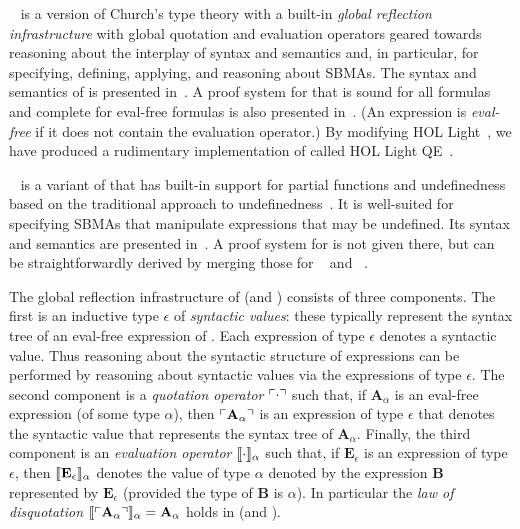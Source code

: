 \documentclass[fleqn]{llncs}
\begin{document}
{\churchqe}~\cite{Farmer18} is a version of Church's type theory with
a built-in \emph{global reflection infrastructure} with global
quotation and evaluation operators geared towards reasoning
about the interplay of syntax and semantics and, in particular, for
specifying, defining, applying, and reasoning about SBMAs.  The syntax
and semantics of {\churchqe} is presented in~\cite{Farmer18}.  A proof
system for {\churchqe} that is sound for all formulas and complete for
eval-free formulas is also presented in~\cite{Farmer18}.  (An
expression is \emph{eval-free} if it does not contain the evaluation
operator.) By modifying HOL Light~\cite{Harrison09}, we have produced
a rudimentary implementation of {\churchqe} called HOL Light
QE~\cite{CaretteFarmerLaskowski18}.

{\churchuqe}~\cite{Farmer17} is a variant of {\churchqe} that has
built-in support for partial functions and undefinedness based on the
traditional approach to undefinedness~\cite{Farmer04}.  It is
well-suited for specifying SBMAs that manipulate expressions that may
be undefined.  Its syntax and semantics are presented in~\cite{Farmer17}.  A
proof system for {\churchuqe} is not given there, but can be straightforwardly
derived by merging those for {\churchqe}~\cite{Farmer18}
and {\qzerou}~\cite{Farmer08a}.

The global reflection infrastructure of {\churchuqe} (and {\churchqe})
consists of three components.  The first is an inductive
type $\epsilon$ of \emph{syntactic values}: these
typically represent the syntax tree of an eval-free expression of
{\churchuqe}.  Each expression of type $\epsilon$ denotes a syntactic
value.  Thus reasoning about the syntactic structure of expressions
can be performed by reasoning about syntactic values via the
expressions of type $\epsilon$.  The second component is a
\emph{quotation operator} $\ulcorner\cdot\urcorner$ such that, if
$\textbf{A}_\alpha$ is an eval-free expression (of some type
$\alpha$), then $\ulcorner\textbf{A}_\alpha\urcorner$ is an expression of
type $\epsilon$ that denotes the syntactic value that represents the
syntax tree of $\textbf{A}_\alpha$.  Finally, the third component is an
\emph{evaluation operator} $\llbracket\cdot\rrbracket_\alpha$ such that, if
$\textbf{E}_\epsilon$ is an expression of type $\epsilon$, then
$\llbracket\textbf{E}_\epsilon\rrbracket_\alpha$ denotes the value of type
$\alpha$ denoted by the expression $\textbf{B}$ represented by
$\textbf{E}_\epsilon$ (provided the type of $\textbf{B}$ is $\alpha$).
In particular the \emph{law of disquotation}
$\llbracket\ulcorner\textbf{A}_\alpha\urcorner\rrbracket_\alpha = \textbf{A}_\alpha$
holds in {\churchuqe} (and {\churchqe}).
\end{document}
